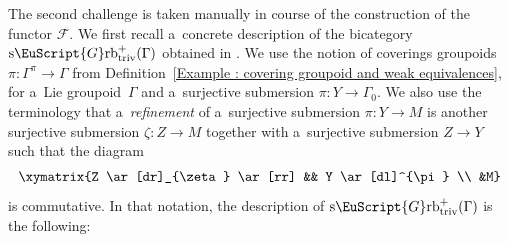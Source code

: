 \documentclass[10pt,a4paper]{amsart}
\numberwithin{equation}{section}
\def\mathscr#1{\EuScript{#1}}
\newcommand{\alxydim}[2]{\begin{aligned}\xymatrix#1{#2}\end{aligned}}
\newcommand{\Grbtriv}{\mathscr{G}\mathrm{rb}_{\mathrm{triv}}}
\newcommand{\sGrbtriv}{\mathrm{s}\Grbtriv}
\begin{document}
The second challenge is taken manually in course of the construction of the functor $\mathcal{F}$.
We first recall a~concrete description of the bicategory $\sGrbtriv^{+}(\Gamma)$ obtained in \cite[Proposition 9.1]{nikolaus2}.
We use the notion of coverings groupoids $\pi\colon \Gamma^{\pi}\to \Gamma$ from Definition~\ref{Example : covering groupoid and weak equivalences}, for a~Lie groupoid~$\Gamma$ and a~surjective submersion $\pi\colon Y \to \Gamma_0$. We also use the terminology that a~\emph{refinement} of a~surjective submersion $\pi\colon Y \to M$ is another surjective submersion $\zeta\colon Z \to M$ together with a~surjective submersion $Z \to Y$ such that the diagram
\begin{equation*}
\alxydim{}{Z \ar[dr]_{\zeta} \ar[rr] && Y \ar[dl]^{\pi} \\ &M}
\end{equation*}
is commutative. In that notation, the description of $\sGrbtriv^{+}(\Gamma)$ is the following:
\end{document}
